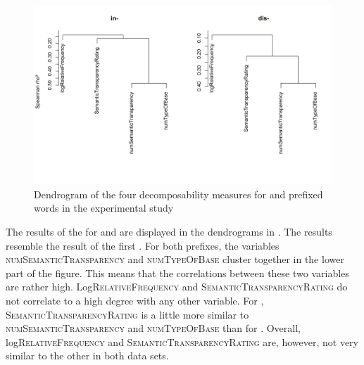  
 

 

  \begin{figure}
  	
  	\includegraphics[scale=0.5]{images/Experiment/clusterAnalysisDecomposabilityExpDisAndIn.png}
  	\caption{ Dendrogram of the four decomposability measures for  and prefixed words in the experimental study}
  	\label{fig:cluster experiment dis and in}
  \end{figure}
  
 The results of the  for  and  are displayed in the dendrograms in . The results resemble the result of the first .
 For both prefixes, the variables \textsc{numSemanticTransparency} and \textsc{numTypeOfBase} cluster together in the lower part of the figure. This means that the correlations between these two variables are rather high. Log\textsc{RelativeFrequency} and \textsc{SemanticTransparencyRating} do not correlate to a high degree with any other variable.
 For , \textsc{SemanticTransparencyRating} is a little more similar to \textsc{numSemanticTransparency} and \textsc{numTypeOfBase} than for . 
 Overall, log\textsc{RelativeFrequency} and \textsc{SemanticTransparencyRating} are, however, not very similar to the other  in both data sets. 

